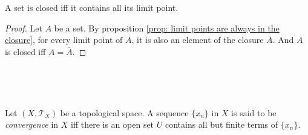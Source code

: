 \begin{proposition}
	A set is closed iff it contains all its limit point.
	
	\begin{proof}
		Let $A$ be a set. By proposition \ref{prop: limit points are always in the closure}, for every limit point of $A$, it is also an element of the closure $\overline A$. And $A$ is closed iff $A = \overline A$.
	\end{proof}
\end{proposition}


\

\

\begin{definition}
	\label{def: convergent sequences}
	Let $(X, \mathcal T_X)$ be a topological space. A sequence $\{x_n\}$ in $X$ is said to be \textit{convergence} in $X$ iff there is an open set $U$ contains all but finite terms of $\{x_n\}$.
\end{definition}







































%
